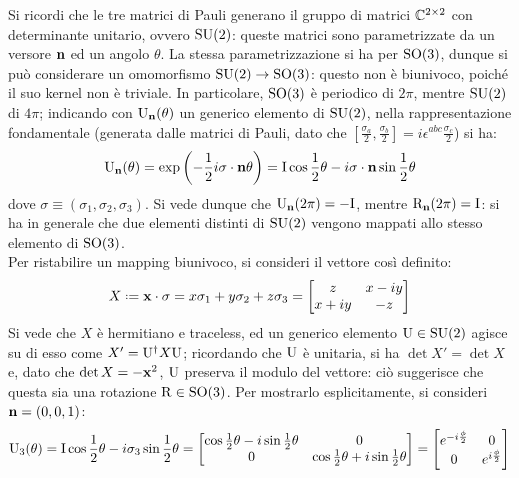 Si ricordi che le tre matrici di Pauli generano il gruppo di matrici $ \mathbb{C}^{2\times2} $ con determinante unitario, ovvero $ \mathrm{SU}(2) $: queste matrici sono parametrizzate da un versore $ \mathbf{n} $ ed un angolo $ \theta $. La stessa parametrizzazione si ha per $ \mathrm{SO}(3) $, dunque si può considerare un omomorfismo $ \mathrm{SU}(2) \rightarrow \mathrm{SO}(3) $: questo non è biunivoco, poiché il suo kernel non è triviale. In particolare, $ \mathrm{SO}(3) $ è periodico di $ 2\pi $, mentre $ \mathrm{SU}(2) $ di $ 4\pi $; indicando con $ \mathrm{U}_{\mathbf{n}}(\theta) $ un generico elemento di $ \mathrm{SU}(2) $, nella rappresentazione fondamentale (generata dalle matrici di Pauli, dato che $ [\frac{\sigma_a}{2}, \frac{\sigma_b}{2}] = i \epsilon^{abc} \frac{\sigma_c}{2} $) si ha:
\begin{equation}
	\mathrm{U}_{\mathbf{n}}(\theta) = \exp \left( -\frac{1}{2} i \sigma \cdot \mathbf{n} \theta \right) = \mathrm{I} \cos \frac{1}{2}\theta - i \sigma \cdot \mathbf{n} \sin \frac{1}{2}\theta
	\label{eq:10.19}
\end{equation}
dove $ \sigma \equiv \left( \sigma_1, \sigma_2, \sigma_3 \right) $. Si vede dunque che $ \mathrm{U}_{\mathbf{n}}(2\pi) = -\mathrm{I} $, mentre $ \mathrm{R}_{\mathbf{n}}(2\pi) = \mathrm{I} $: si ha in generale che due elementi distinti di $ \mathrm{SU}(2) $ vengono mappati allo stesso elemento di $ \mathrm{SO}(3) $.\\
Per ristabilire un mapping biunivoco, si consideri il vettore così definito:
\begin{equation*}
	X \defeq \ve{x} \cdot \sigma = x \sigma_1 + y \sigma_2 + z \sigma_3 =
	\begin{bmatrix}
		z & x - i y \\
		x + i y & -z
	\end{bmatrix}
\end{equation*}
Si vede che $ X $ è hermitiano e traceless, ed un generico elemento $ \mathrm{U} \in \mathrm{SU}(2) $ agisce su di esso come $ X' = \mathrm{U}^{\dagger} X \mathrm{U} $; ricordando che $ \mathrm{U} $ è unitaria, si ha $ \det X' = \det X $ e, dato che $ \det X = -\mathbf{x}^2 $, $ \mathrm{U} $ preserva il modulo del vettore: ciò suggerisce che questa sia una rotazione $ \mathrm{R} \in \mathrm{SO}(3) $. Per mostrarlo esplicitamente, si consideri $ \mathbf{n} = (0,0,1) $:
\begin{equation*}
	\mathrm{U}_3(\theta) = \mathrm{I} \cos \frac{1}{2} \theta - i \sigma_3 \sin \frac{1}{2} \theta =
	\begin{bmatrix}
		\cos \frac{1}{2} \theta - i \sin \frac{1}{2} \theta & 0 \\
		0 & \cos \frac{1}{2} \theta + i \sin \frac{1}{2} \theta
	\end{bmatrix}
	=
	\begin{bmatrix}
		e^{-i \frac{\phi}{2}} & 0 \\ 0 & e^{i \frac{\phi}{2}}
	\end{bmatrix}
\end{equation*}
